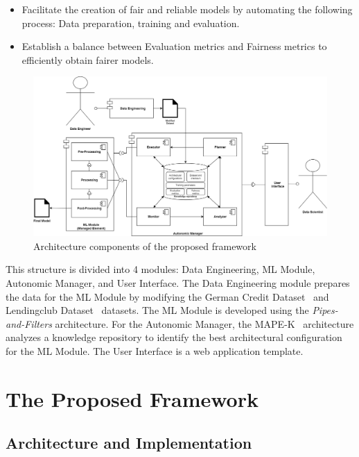 \documentclass[sigconf]{acmart}
\begin{document}
\begin{itemize}
\item Facilitate the creation of fair and reliable models by automating the following process: Data preparation, training and evaluation.
\item Establish a balance between Evaluation metrics and Fairness metrics to efficiently obtain fairer models.
\end{itemize}

\begin{figure}[h]
\centering
\includegraphics[scale=0.285]{images/backend-frontend-ml-eng.jpg}
\caption {Architecture components of the proposed framework}
\label{fig:BackendFrontendML}
\end{figure}

This structure is divided into 4 modules: Data Engineering, ML Module, Autonomic Manager, and User Interface. The Data Engineering module prepares the data for the ML Module by modifying the German Credit Dataset~\citep{ucigerman_2021} and Lendingclub Dataset~\citep{lendingclub_2022} datasets. The ML Module is developed using the \textit{Pipes-and-Filters} architecture. For the Autonomic Manager, the MAPE-K~\citep{IBM_2005} architecture analyzes a knowledge repository to identify the best architectural configuration for the ML Module. The User Interface is a web application template.

\section{The Proposed Framework}

\subsection{Architecture and Implementation}
\end{document}
